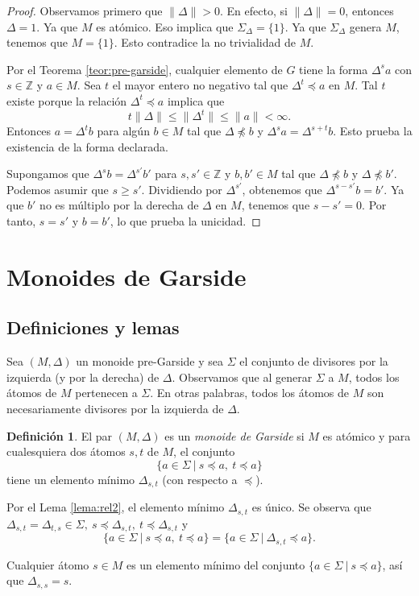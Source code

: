 \documentclass[12pt]{book}
\theoremstyle{definition}
\newtheorem{defi}{Definición}[section]
\providecommand{\norm}[1]{\lVert#1\rVert}
\begin{document}
\begin{proof} Observamos primero que $\norm{\Delta}>0$. En efecto, si $\norm{\Delta}= 0$, entonces $\Delta=1$. Ya que $M$ es atómico. Eso implica que $\Sigma_\Delta=\{1\}$. Ya que $\Sigma_\Delta$ genera $M$, tenemos que $M=\{1\}$. Esto contradice la no trivialidad de $M$.

Por el Teorema \ref{teor:pre-garside}, cualquier elemento de $G$ tiene la forma $\Delta^sa$ con $s\in\mathbb{Z}$ y $a\in M$. Sea $t$ el mayor entero no negativo tal que $\Delta^t\preceq a$ en $M$. Tal $t$ existe porque la relación $\Delta^t\preceq a$ implica que
$$t\norm{\Delta}\leq \norm{\Delta^t}\leq \norm{a}<\infty.$$
Entonces $a=\Delta^t b$ para algún $b\in M$ tal que $\Delta\npreceq b$ y $\Delta^s a=\Delta^{s+t} b$. Esto prueba la existencia de la forma declarada.

Supongamos que $\Delta^s b=\Delta^{s'}b'$ para $s,s'\in\mathbb{Z}$ y $b,b'\in M$ tal que $\Delta\npreceq b$ y $\Delta\npreceq b'$. Podemos asumir que $s\geq s'$. Dividiendo por $\Delta^{s'}$, obtenemos que $\Delta^{s-s'}b=b'$. Ya que $b'$ no es múltiplo por la derecha de $\Delta$ en $M$, tenemos que $s-s'=0$. Por tanto, $s=s'$ y $b=b'$, lo que prueba la unicidad.
\end{proof}

\section{Monoides de Garside}
\subsection{Definiciones y lemas}

Sea $(M,\Delta)$ un monoide pre-Garside y sea $\Sigma$ el conjunto de divisores por la izquierda (y por la derecha) de $\Delta$. Observamos que al generar $\Sigma$ a $M$, todos los átomos de $M$ pertenecen a $\Sigma$. En otras palabras, todos los átomos de $M$ son necesariamente divisores por la izquierda de $\Delta$.

\begin{defi}
El par $(M,\Delta)$ es un \textit{monoide de Garside} si $M$ es atómico y para cualesquiera dos átomos $s,t$ de $M$, el conjunto
$$\{a\in\Sigma\ |\ s\preceq a,\ t\preceq a \}$$
tiene un elemento mínimo $\Delta_{s,t}$ (con respecto a $\preceq$).

Por el Lema \ref{lema:rel2}, el elemento mínimo $\Delta_{s,t}$ es único. Se observa que $\Delta_{s,t}=\Delta_{t,s}\in\Sigma,\ s\preceq\Delta_{s,t},\ t\preceq\Delta_{s,t}$ y 
$$\{a\in\Sigma\ |\ s\preceq a,\ t\preceq a \}=\{a\in\Sigma\ |\ \Delta_{s,t}\preceq a\}.$$

Cualquier átomo $s\in M$ es un elemento mínimo del conjunto $\{a\in\Sigma\ |\ s\preceq a\}$, así que $\Delta_{s,s}=s$.
\label{defi:garside}
\end{defi}
\end{document}
